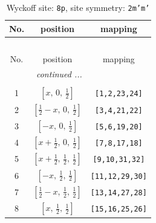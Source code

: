 \documentclass[fleqn,8pt]{jsarticle}
\begin{document}
\begin{longtable}{ccc}
\caption{Wyckoff site: {\tt 8p}, site symmetry: {\tt 2m'm'}}
 \\
 \hline \hline
No. & position & mapping \\ \hline \endfirsthead

\multicolumn{2}{l}{\tablename\ \thetable{}} \\
 \hline \hline
No. & position & mapping \\ \hline \endhead

 \hline \hline
\multicolumn{2}{r}{\footnotesize\it continued ...} \\ \endfoot

 \hline \hline
\multicolumn{2}{r}{} \\ \endlastfoot

1 & $\left[ x,\, 0,\, \frac{1}{2} \right]$ & {\tt [1,2,23,24]} \\ \hline
2 & $\left[ \frac{1}{2} - x,\, 0,\, \frac{1}{2} \right]$ & {\tt [3,4,21,22]} \\ \hline
3 & $\left[ - x,\, 0,\, \frac{1}{2} \right]$ & {\tt [5,6,19,20]} \\ \hline
4 & $\left[ x + \frac{1}{2},\, 0,\, \frac{1}{2} \right]$ & {\tt [7,8,17,18]} \\ \hline
5 & $\left[ x + \frac{1}{2},\, \frac{1}{2},\, \frac{1}{2} \right]$ & {\tt [9,10,31,32]} \\ \hline
6 & $\left[ - x,\, \frac{1}{2},\, \frac{1}{2} \right]$ & {\tt [11,12,29,30]} \\ \hline
7 & $\left[ \frac{1}{2} - x,\, \frac{1}{2},\, \frac{1}{2} \right]$ & {\tt [13,14,27,28]} \\ \hline
8 & $\left[ x,\, \frac{1}{2},\, \frac{1}{2} \right]$ & {\tt [15,16,25,26]} \\
\end{longtable}
\renewcommand{\arraystretch}{1.2}
\end{document}
